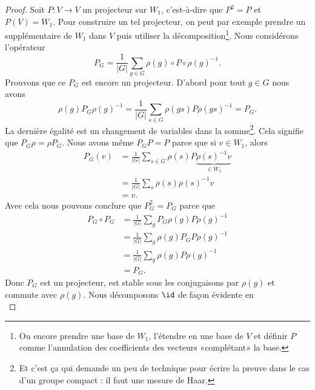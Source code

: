 \begin{proof}
	Soit \( P\colon V\to V\) un projecteur sur \( W_1\), c'est-à-dire que \( P^2=P\) et \( P(V)=W_1\). Pour construire un tel projecteur, on peut par exemple prendre un supplémentaire de \( W_1\) dans \( V\) puis utiliser la décomposition\footnote{Ou encore prendre une base de \( W_1\), l'étendre en une base de \( V\) et définir \( P\) comme l'annulation des coefficients des vecteurs «complétant» la base.}. Nous considérons l'opérateur
	\begin{equation}
		P_G=\frac{1}{ | G | }\sum_{g\in G}\rho(g)\circ P\circ \rho(g)^{-1}.
	\end{equation}
	Prouvons que ce \( P_G\) est encore un projecteur. D'abord pour tout \( g\in G\) nous avons
	\begin{equation}
		\rho(g)P_G\rho(g)^{-1}=\frac{1}{ | G | }\sum_{s\in G}\rho(gs)P\rho(gs)^{-1}=P_G.
	\end{equation}
	La dernière égalité est un changement de variables dans la somme\footnote{Et c'est ça qui demande un peu de technique pour écrire la preuve dans le cas d'un groupe compact : il faut une mesure de Haar.}. Cela signifie que \( P_G\rho=\rho P_G\). Nous avons même \( P_GP=P\) parce que si \( v\in W_1\), alors
	\begin{subequations}
		\begin{align}
			P_G(v) & =\frac{1}{ | G | }\sum_{s\in G}\rho(s)P\underbrace{\rho(s)^{-1} v}_{\in W_1} \\
			       & =\frac{1}{ | G | }\sum_s\rho(s)\rho(s)^{-1} v                                \\
			       & =v.
		\end{align}
	\end{subequations}
	Avec cela nous pouvons conclure que \( P_G^2=P_G\) parce que
	\begin{subequations}
		\begin{align}
			P_G\circ P_G & =\frac{1}{ | G | }\sum_g P_G\rho(g)P\rho(g)^{-1} \\
			             & =\frac{1}{ | G | }\sum_g \rho(g)P_GP\rho(g)^{-1} \\
			             & =\frac{1}{ | G | }\sum_g \rho(g)P\rho(g)^{-1}    \\
			             & =P_G.
		\end{align}
	\end{subequations}
	Donc \( P_G\) est un projecteur, est stable sous les conjugaisons par \( \rho(g)\) et commute avec \( \rho(g)\). Nous décomposons \( \id\) de façon évidente en
	\begin{equation}

\end{equation}
\end{proof}
